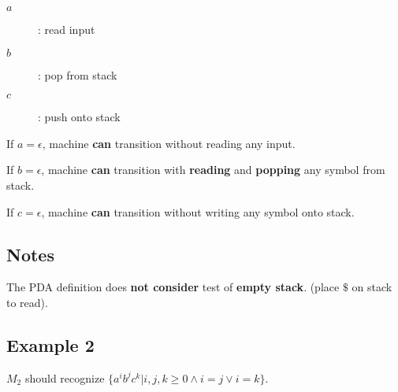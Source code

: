 \documentclass{article}
\begin{document}
\begin{description}
\item[$a$]: read input
\item[$b$]: pop from stack
\item[$c$]: push onto stack
\end{description}

If $a=\epsilon$, machine \textbf{can} transition without reading any
input.

If $b=\epsilon$, machine \textbf{can} transition with \textbf{reading}
and \textbf{popping} any symbol from stack.

If $c=\epsilon$, machine \textbf{can} transition without writing any
symbol onto stack.

\subsection*{Notes}

The PDA definition does \textbf{not consider} test of \textbf{empty
  stack}. (place $\$$ on stack to read).

\subsection*{Example 2}

$M_2$ should recognize $\{a^ib^jc^k|i,j,k\ge0\wedge{}i=j\vee{}i=k\}$.
\end{document}
